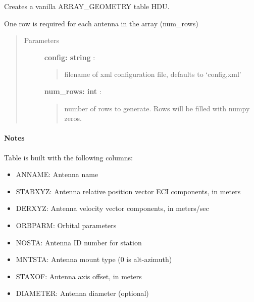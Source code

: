 \documentclass[letterpaper,10pt,english]{sphinxmanual}
\begin{document}
\begin{fulllineitems}
\label{index:pyFitsidi.make_array_geometry}
Creates a vanilla ARRAY\_GEOMETRY table HDU.

One row is required for each antenna in the array (num\_rows)
\begin{quote}\begin{description}
\item[{Parameters }] \leavevmode
\textbf{config: string} :
\begin{quote}

filename of xml configuration file, defaults to `config,xml'
\end{quote}

\textbf{num\_rows: int} :
\begin{quote}

number of rows to generate. Rows will be filled with numpy zeros.
\end{quote}

\end{description}\end{quote}
\paragraph{Notes}

Table is built with the following columns:
\begin{itemize}
\item {} 
ANNAME: Antenna name

\item {} 
STABXYZ: Antenna relative position vector ECI components, in meters

\item {} 
DERXYZ: Antenna velocity vector components, in meters/sec

\item {} 
ORBPARM: Orbital parameters

\item {} 
NOSTA: Antenna ID number for station

\item {} 
MNTSTA: Antenna mount type (0 is alt-azimuth)

\item {} 
STAXOF: Antenna axis offset, in meters

\item {} 
DIAMETER: Antenna diameter (optional)

\end{itemize}

\end{fulllineitems}
\end{document}
